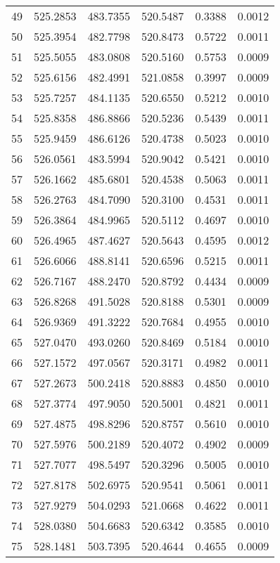 \documentclass{article}
\begin{document}
\begin{longtable}{|c|c|c|c|c|c|}
49 & 525.2853 & 483.7355 & 520.5487 & 0.3388 & 0.0012 \\
50 & 525.3954 & 482.7798 & 520.8473 & 0.5722 & 0.0011 \\
51 & 525.5055 & 483.0808 & 520.5160 & 0.5753 & 0.0009 \\
52 & 525.6156 & 482.4991 & 521.0858 & 0.3997 & 0.0009 \\
53 & 525.7257 & 484.1135 & 520.6550 & 0.5212 & 0.0010 \\
54 & 525.8358 & 486.8866 & 520.5236 & 0.5439 & 0.0011 \\
55 & 525.9459 & 486.6126 & 520.4738 & 0.5023 & 0.0010 \\
56 & 526.0561 & 483.5994 & 520.9042 & 0.5421 & 0.0010 \\
57 & 526.1662 & 485.6801 & 520.4538 & 0.5063 & 0.0011 \\
58 & 526.2763 & 484.7090 & 520.3100 & 0.4531 & 0.0011 \\
59 & 526.3864 & 484.9965 & 520.5112 & 0.4697 & 0.0010 \\
60 & 526.4965 & 487.4627 & 520.5643 & 0.4595 & 0.0012 \\
61 & 526.6066 & 488.8141 & 520.6596 & 0.5215 & 0.0011 \\
62 & 526.7167 & 488.2470 & 520.8792 & 0.4434 & 0.0009 \\
63 & 526.8268 & 491.5028 & 520.8188 & 0.5301 & 0.0009 \\
64 & 526.9369 & 491.3222 & 520.7684 & 0.4955 & 0.0010 \\
65 & 527.0470 & 493.0260 & 520.8469 & 0.5184 & 0.0010 \\
66 & 527.1572 & 497.0567 & 520.3171 & 0.4982 & 0.0011 \\
67 & 527.2673 & 500.2418 & 520.8883 & 0.4850 & 0.0010 \\
68 & 527.3774 & 497.9050 & 520.5001 & 0.4821 & 0.0011 \\
69 & 527.4875 & 498.8296 & 520.8757 & 0.5610 & 0.0010 \\
70 & 527.5976 & 500.2189 & 520.4072 & 0.4902 & 0.0009 \\
71 & 527.7077 & 498.5497 & 520.3296 & 0.5005 & 0.0010 \\
72 & 527.8178 & 502.6975 & 520.9541 & 0.5061 & 0.0011 \\
73 & 527.9279 & 504.0293 & 521.0668 & 0.4622 & 0.0011 \\
74 & 528.0380 & 504.6683 & 520.6342 & 0.3585 & 0.0010 \\
75 & 528.1481 & 503.7395 & 520.4644 & 0.4655 & 0.0009 \\

\end{longtable}
\end{document}
